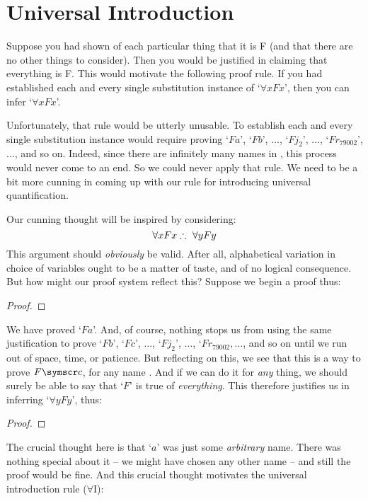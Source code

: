 \section{Universal Introduction}\label{uniint}
Suppose you had shown of each particular thing that it is F (and that there are no other things to consider). Then you would be justified in claiming that everything is F. This would motivate the following proof rule. If you had established each and every single substitution instance of `$\forall x Fx$', then you can infer `$\forall x Fx$'. 

Unfortunately, that rule would be utterly unusable. To establish each and every single substitution instance would require proving `$Fa$', `$Fb$', $…$, `$Fj_2$', $…$, `$Fr_{79002}$', $…$, and so on. Indeed, since there are infinitely many names in \FOL, this process would never come to an end. So we could never apply that rule. We need to be a bit more cunning in coming up with our rule for introducing universal quantification. 

Our cunning thought will be inspired by considering:
$$\forall x Fx \mathrel{\therefore}\ \forall y Fy$$
This argument should \emph{obviously} be valid. After all, alphabetical variation in choice of variables ought to be a matter of taste, and of no logical consequence. But how might our proof system reflect this? Suppose we begin a proof thus:
\begin{proof}
	 
\end{proof}
We have proved `$Fa$'. And, of course, nothing stops us from using the same justification to prove `$Fb$', `$Fc$', $…$, `$Fj_2$', $…$, `$Fr_{79002}, …$, and so on until we run out of space, time, or patience. But reflecting on this, we see that this is a way to prove $F\meta{c}$, for any name . And if we can do it for \emph{any} thing, we should surely be able to say that `$F$' is true of \emph{everything}. This therefore justifies us in inferring `$\forall y Fy$', thus:
\begin{proof}
	 
	 
\end{proof}
The crucial thought here is that `$a$' was just some \emph{arbitrary} name. There was nothing special about it – we might have chosen any other name – and still the proof would be fine. And this crucial thought motivates the universal introduction rule ($\forall$I):

